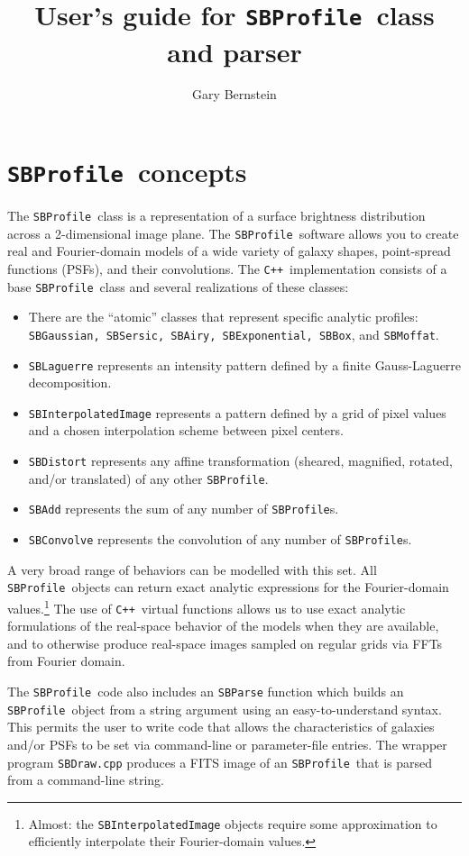 \documentclass[11pt,preprint,flushrt]{aastex}
\begin{document}
\def\cpp{{\tt C++}}
\def\sbp{{\tt SBProfile}}
\def\sbph{{\tt SBProfile.h}}
\def\eqq#1{Equation~(\ref{#1})}

\title{User's guide for \sbp\ class and parser}
\author{Gary Bernstein}

\section{\sbp\ concepts}
The \sbp\ class is a representation of a surface brightness distribution across a 2-dimensional image plane.
The \sbp\ software allows you to create real and Fourier-domain models of a wide variety of galaxy shapes, point-spread functions (PSFs), and their convolutions.  The \cpp\ implementation consists of a base \sbp\ class and several realizations of these classes:
\begin{itemize}
\item There are the ``atomic'' classes that represent specific analytic profiles: {\tt SBGaussian, SBSersic, SBAiry, SBExponential, SBBox}, and {\tt SBMoffat}.
\item {\tt SBLaguerre} represents an intensity pattern defined by a finite Gauss-Laguerre decomposition.
\item {\tt SBInterpolatedImage} represents a pattern defined by a grid of pixel values and a chosen interpolation scheme between pixel centers.
\item {\tt SBDistort} represents any affine transformation (sheared, magnified, rotated, and/or translated) of any other \sbp.
\item {\tt SBAdd} represents the sum of any number of {\sbp}s.
\item {\tt SBConvolve} represents the convolution of any number of {\sbp}s.
\end{itemize}
A very broad range of behaviors can be modelled with this set.  All \sbp\ objects can return exact analytic expressions for the Fourier-domain values.\footnote{Almost: the {\tt SBInterpolatedImage} objects require some approximation to efficiently interpolate their Fourier-domain values.}  The use of \cpp\ virtual functions allows us to use exact analytic formulations of the real-space behavior of the models when they are available, and to otherwise produce real-space images sampled on regular grids via FFTs from Fourier domain.  

The \sbp\ code also includes an {\tt SBParse} function which builds an \sbp\ object from a string argument using an easy-to-understand syntax.  This permits the user to write code that allows the characteristics of galaxies and/or PSFs to be set via command-line or parameter-file entries.  The wrapper program {\tt SBDraw.cpp} produces a FITS image of an \sbp\ that is parsed from a command-line string.  
\end{document}

